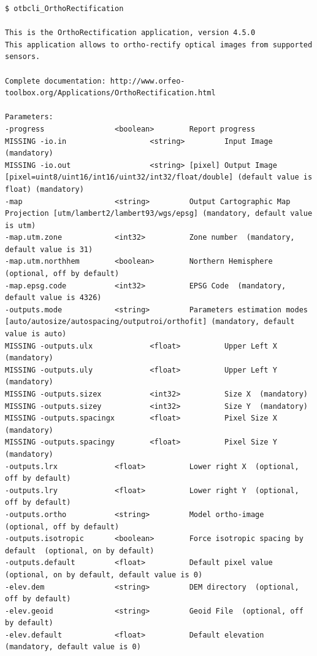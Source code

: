 \documentclass[8pt]{beamer}
\begin{document}
\begin{frame}[fragile]
\begin{scriptsize}
\vspace{-0.5cm}\begin{verbatim}
$ otbcli_OrthoRectification

This is the OrthoRectification application, version 4.5.0
This application allows to ortho-rectify optical images from supported sensors.

Complete documentation: http://www.orfeo-toolbox.org/Applications/OrthoRectification.html

Parameters: 
-progress                <boolean>        Report progress 
MISSING -io.in                   <string>         Input Image  (mandatory)
MISSING -io.out                  <string> [pixel] Output Image  [pixel=uint8/uint16/int16/uint32/int32/float/double] (default value is float) (mandatory)
-map                     <string>         Output Cartographic Map Projection [utm/lambert2/lambert93/wgs/epsg] (mandatory, default value is utm)
-map.utm.zone            <int32>          Zone number  (mandatory, default value is 31)
-map.utm.northhem        <boolean>        Northern Hemisphere  (optional, off by default)
-map.epsg.code           <int32>          EPSG Code  (mandatory, default value is 4326)
-outputs.mode            <string>         Parameters estimation modes [auto/autosize/autospacing/outputroi/orthofit] (mandatory, default value is auto)
MISSING -outputs.ulx             <float>          Upper Left X  (mandatory)
MISSING -outputs.uly             <float>          Upper Left Y  (mandatory)
MISSING -outputs.sizex           <int32>          Size X  (mandatory)
MISSING -outputs.sizey           <int32>          Size Y  (mandatory)
MISSING -outputs.spacingx        <float>          Pixel Size X  (mandatory)
MISSING -outputs.spacingy        <float>          Pixel Size Y  (mandatory)
-outputs.lrx             <float>          Lower right X  (optional, off by default)
-outputs.lry             <float>          Lower right Y  (optional, off by default)
-outputs.ortho           <string>         Model ortho-image  (optional, off by default)
-outputs.isotropic       <boolean>        Force isotropic spacing by default  (optional, on by default)
-outputs.default         <float>          Default pixel value  (optional, on by default, default value is 0)
-elev.dem                <string>         DEM directory  (optional, off by default)
-elev.geoid              <string>         Geoid File  (optional, off by default)
-elev.default            <float>          Default elevation  (mandatory, default value is 0)

\end{verbatim}
\end{scriptsize}
\end{frame}
\end{document}
